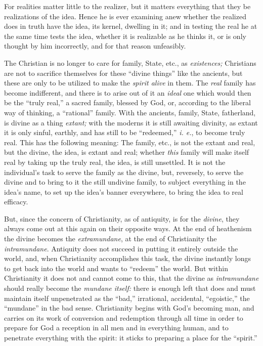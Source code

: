 \documentclass[12pt,a4paper]{book}
\begin{document}
For realities matter little to the realizer, but it matters everything that 
they be realizations of the idea. Hence he is ever examining anew whether the 
realized does in truth have the idea, its kernel, dwelling in it; and in 
testing the real he at the same time tests the idea, whether it is realizable 
as he thinks it, or is only thought by him incorrectly, and for that reason 
unfeasibly.

The Christian is no longer to care for family, State, etc., as 
\textit{existences;} Christians are not to sacrifice themselves for these 
``divine things'' like the ancients, but these are only to be utilized to 
make the \textit{spirit alive} in them. The \textit{real} family has become 
indifferent, and there is to arise out of it an \textit{ideal} one which would 
then be the ``truly real,'' a sacred family, blessed by God, or, according 
to the liberal way of thinking, a ``rational'' family. With the ancients, 
family, State, fatherland, is divine as a thing \textit{extant;} with the 
moderns it is still awaiting divinity, as extant it is only sinful, earthly, 
and has still to be ``redeemed,'' \textit{i. e.}, to become truly real. This 
has the following meaning: The family, etc., is not the extant and real, but 
the divine, the idea, is extant and real; whether \textit{this} family will 
make itself real by taking up the truly real, the idea, is still unsettled. It 
is not the individual's task to serve the family as the divine, but, 
reversely, to serve the divine and to bring to it the still undivine family, 
to subject everything in the idea's name, to set up the idea's banner 
everywhere, to bring the idea to real efficacy.

But, since the concern of Christianity, as of antiquity, is for the 
\textit{divine}, they always come out at this again on their opposite ways. At 
the end of heathenism the divine becomes the \textit{extramundane}, at the end 
of Christianity the \textit{intramundane}. Antiquity does not succeed in 
putting it entirely outside the world, and, when Christianity accomplishes 
this task, the divine instantly longs to get back into the world and wants to 
``redeem'' the world. But within Christianity it does not and cannot come to 
this, that the divine as \textit{intramundane} should really become the 
\textit{mundane itself:} there is enough left that does and must maintain 
itself unpenetrated as the ``bad,'' irrational, accidental, ``egoistic,'' 
the ``mundane'' in the bad sense. Christianity begins with God's becoming 
man, and carries on its work of conversion and redemption through all time in 
order to prepare for God a reception in all men and in everything human, and 
to penetrate everything with the spirit: it sticks to preparing a place for 
the ``spirit.''
\end{document}
